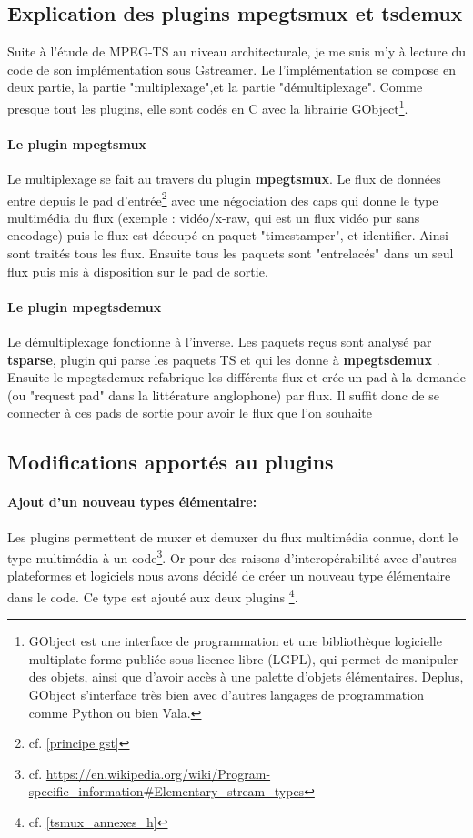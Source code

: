 \subsection{Explication des plugins mpegtsmux et tsdemux}
Suite à l'étude de MPEG-TS au niveau architecturale, je me suis m'y à lecture du code de son implémentation sous Gstreamer. Le l'implémentation se compose en deux partie,
la partie "multiplexage",et la partie "démultiplexage". Comme presque tout les plugins, elle sont codés en C avec la librairie GObject\footnote{GObject est une interface de programmation et une bibliothèque logicielle multiplate-forme publiée sous licence libre (LGPL), qui permet de manipuler des objets, ainsi que d'avoir accès à une palette d'objets élémentaires. Deplus, GObject s'interface très bien avec d'autres langages de programmation comme Python ou bien Vala.}.\\
  \paragraph{Le plugin mpegtsmux}
Le multiplexage se fait au travers du plugin \textbf{mpegtsmux}. Le flux de données entre depuis le pad d'entrée\footnote{cf. \ref{principe gst}} avec une négociation des caps qui donne le type multimédia du flux (exemple : vidéo/x-raw, qui est un flux vidéo pur sans encodage) puis le flux est découpé en paquet "timestamper", et identifier. Ainsi sont traités tous les flux. Ensuite tous les paquets sont "entrelacés" dans un seul flux puis mis à disposition sur le pad de sortie.
  \paragraph{Le plugin mpegtsdemux}
Le démultiplexage fonctionne à l'inverse. Les paquets reçus sont analysé par \textbf{tsparse}, plugin qui parse les paquets TS et qui les donne à \textbf{mpegtsdemux} . Ensuite le mpegtsdemux refabrique les différents flux et crée un pad à la demande (ou "request pad" dans la littérature anglophone) par flux. Il suffit donc de se connecter à ces pads de sortie pour avoir le flux que l'on souhaite

\subsection{Modifications apportés au plugins}

\paragraph{Ajout d'un nouveau types élémentaire:} Les plugins permettent de muxer et demuxer du flux multimédia connue, dont le type multimédia à un code\footnote{cf. \url{https://en.wikipedia.org/wiki/Program-specific_information#Elementary_stream_types}}. Or pour des raisons d'interopérabilité avec d'autres plateformes et logiciels nous avons décidé de créer un nouveau type élémentaire dans le code. Ce type est ajouté aux deux plugins \footnote{cf. \ref{tsmux_annexes_h}}.
